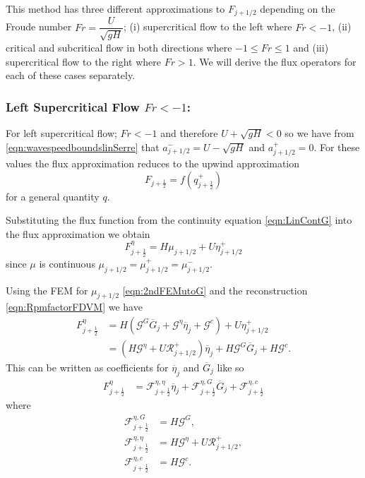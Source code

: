 This method has three different approximations to $F_{j+1/2}$ depending on the Froude number $Fr = \dfrac{U}{\sqrt{gH}}$; (i)
supercritical flow to the left where $Fr < -1$, (ii) critical and subcritical flow in both directions where $-1 \le Fr \le 1$ and (iii) supercritical flow to the right where $Fr > 1$. We will derive the flux operators for each of these cases separately.

\subsubsection{Left Supercritical Flow $Fr < -1$:}
For left supercritical flow; $Fr < -1$ and therefore $U + \sqrt{g H} < 0$ so we have from \eqref{eqn:wavespeedboundslinSerre} that $a^-_{j+ 1/2} = U - \sqrt{g H}$ and $a^+_{j+ 1/2} =  0$. For these values the flux approximation reduces to the upwind approximation 
\begin{equation}
F_{j+\frac{1}{2}} = f\left(q^+_{j+\frac{1}{2}}\right)
\label{eqn:fluxleftsupercrit}
\end{equation}
for a general quantity $q$.

Substituting the flux function from the continuity equation \eqref{eqn:LinContG} into the flux approximation we obtain
\begin{equation*}
F^\eta_{j+\frac{1}{2}} = H \mu_{j+1/2} + U \eta^+_{j+1/2}
\end{equation*}
since $\mu$ is continuous $\mu_{j+1/2} = \mu_{j+1/2}^+ = \mu_{j+1/2}^- $. 

Using the FEM for $\mu_{j+1/2}$ \eqref{eqn:2ndFEMutoG} and the reconstruction \eqref{eqn:RpmfactorFDVM} we have
\begin{align*}
F^\eta_{j+\frac{1}{2}} &= H \left(\mathcal{G}^G \overline{G}_{j} + \mathcal{G}^{\eta} \overline{\eta}_{j} + \mathcal{G}^c\right) + U \eta^+_{j+1/2} \nonumber \\ &= \left(H \mathcal{G}^{\eta} + U \mathcal{R}^+_{j+1/2} \right)  \overline{\eta}_{j} + H \mathcal{G}^G \overline{G}_{j} + H\mathcal{G}^c .
\end{align*}
This can be written as coefficients for $\overline{\eta}_{j}$ and $\overline{G}_{j}$ like so
\begin{align*}
F^\eta_{j+\frac{1}{2}} &= \mathcal{F}^{\eta, \eta}_{j+\frac{1}{2}} \overline{\eta}_{j} + \mathcal{F}^{\eta, G}_{j+\frac{1}{2}} \overline{G}_{j} + \mathcal{F}^{\eta, c}_{j+\frac{1}{2}}
\end{align*}
where
\begin{align*}
\mathcal{F}^{\eta, G}_{j+\frac{1}{2}} &=  H \mathcal{G}^G,\\
\mathcal{F}^{\eta, \eta}_{j+\frac{1}{2}} &=  H \mathcal{G}^{\eta} + U \mathcal{R}^+_{j+1/2},\\
\mathcal{F}^{\eta, c}_{j+\frac{1}{2}} &=  H\mathcal{G}^c.
\end{align*}

